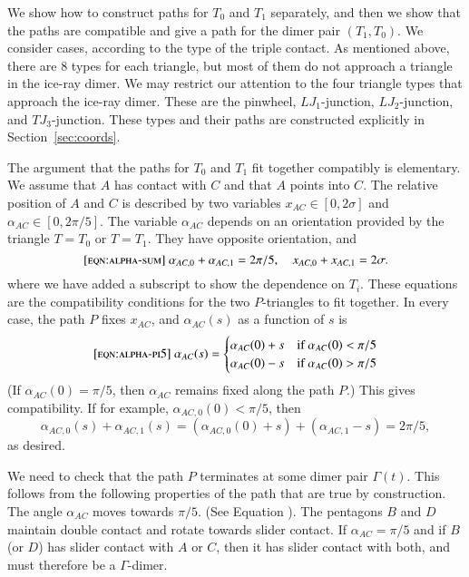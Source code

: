 We show how to construct paths for $T_0$ and $T_1$ separately, and
then we show that the paths are compatible and give a path for the
dimer pair $(T_1,T_0)$.  We consider cases, according to the type of
the triple contact.  As mentioned above, there are $8$ types for each
triangle, but most of them do not approach a triangle in the ice-ray
dimer.  We may restrict our attention to the four triangle types that
approach the ice-ray dimer.  These are the pinwheel, $LJ_1$-junction,
$LJ_2$-junction, and $TJ_3$-junction.  These types and their paths are
constructed explicitly in Section~\ref{sec:coords}.

The argument that the paths for $T_0$ and $T_1$ fit together
compatibly is elementary.  We assume that $A$ has contact with $C$ and
that $A$ points into $C$.  The relative position of $A$ and $C$ is
described by two variables $x_{AC}\in[0,2\sigma]$ and
$\alpha_{AC}\in[0,2\pi/5]$.  The variable $\alpha_{AC}$ depends on an
orientation provided by the triangle $T=T_0$ or $T=T_1$.  They have
opposite orientation, and
\begin{equation}\libel{eqn:alpha-sum}
\alpha_{AC,0}+\alpha_{AC,1} = 2\pi/5,\quad x_{AC,0} + x_{AC,1} = 2\sigma.
\end{equation}
where we have added a subscript to show the dependence on $T_i$.
These equations are the compatibility conditions for the two
$P$-triangles to fit together.  In every case, the path $P$ fixes
$x_{AC}$, and $\alpha_{AC}(s)$ as a function of $s$ is
\begin{equation}\libel{eqn:alpha-pi5}
\alpha_{AC}(s) = 
\begin{cases}
\alpha_{AC}(0) + s&\text{if } \alpha_{AC}(0) < \pi/5\\
\alpha_{AC}(0) - s&\text{if } \alpha_{AC}(0) > \pi/5\\
\end{cases}
\end{equation}
(If $\alpha_{AC}(0) = \pi/5$, then $\alpha_{AC}$ remains fixed along
the path $P$.)  This gives compatibility. If for example,
$\alpha_{AC,0}(0) < \pi/5$, then
\[
\alpha_{AC,0}(s) + \alpha_{AC,1}(s) 
= (\alpha_{AC,0}(0) + s) + (\alpha_{AC,1} - s) = 2\pi/5,
\]
as desired.

We need to check that the path $P$ terminates at some dimer pair
$\Gamma(t)$.  This follows from the following properties of the path
that are true by construction.  The angle $\alpha_{AC}$ moves towards
$\pi/5$. (See Equation ). The pentagons $B$ and $D$
maintain double contact and rotate towards slider contact.  If
$\alpha_{AC}=\pi/5$ and if $B$ (or $D$) has slider contact with $A$ or
$C$, then it has slider contact with both, and must therefore be a
$\Gamma$-dimer.

